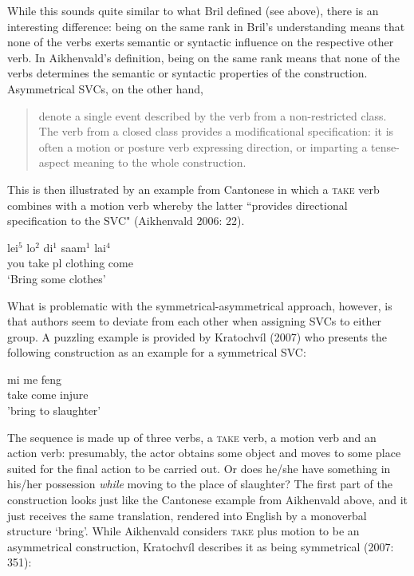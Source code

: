 While this sounds quite similar to what Bril defined (see above), there is an interesting difference: being on the same rank in Bril's understanding means that none of the verbs exerts semantic or syntactic influence on the respective other verb. In Aikhenvald's definition, being on the same rank means that none of the verbs determines the semantic or syntactic properties of the construction. Asymmetrical SVCs, on the other hand, 

\begin{quote}denote a single event described by the verb from a non-restricted class. The verb from a closed class provides a modificational specification: it is often a motion or posture verb expressing direction, or imparting a tense-aspect meaning to the whole construction.\end{quote}

This is then illustrated by an example from Cantonese in which a \textsc{take} verb combines with a motion verb whereby the latter ``provides directional specification to the SVC" (Aikhenvald 2006: 22).

\ea \label{}
\gll lei$^5$ lo$^2$ di$^1$ saam$^1$ lai$^4$ \\
you take \acs{pl} clothing come \\
\glft `Bring some clothes' \\ 
\z
\xe

What is problematic with the symmetrical-asymmetrical approach, however, is that authors seem to deviate from each other when assigning SVCs to either group. A puzzling example is provided by Kratochvíl (2007) who presents the following construction as an example for a symmetrical SVC:

\ea \label{}
\gll mi me feng \\
 take come injure \\
\glft 'bring to slaughter' \\ 
\z
\xe

The sequence is made up of three verbs, a \textsc{take} verb, a motion verb and an action verb: presumably, the actor obtains some object and moves to some place suited for the final action to be carried out. Or does he/she have something in his/her possession \textit{while} moving to the place of slaughter? The first part of the construction looks just like the Cantonese example from Aikhenvald above, and it just receives the same translation, rendered into English by a monoverbal structure `bring'. While Aikhenvald considers \textsc{take} plus motion to be an asymmetrical construction, Kratochvíl describes it as being symmetrical (2007: 351):

